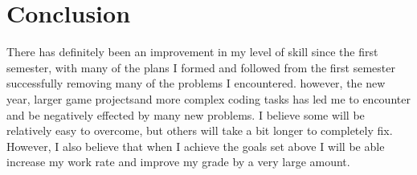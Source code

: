 \documentclass{scrartcl}
\begin{document}
\section{Conclusion}
There has definitely been an improvement in my level of skill since the first semester, with many of the plans I formed and followed from the first semester successfully removing many of the problems I encountered. however, the new year, larger game projectsand more complex coding tasks has led me to encounter and be negatively effected by many new problems. I believe some will be relatively easy to overcome, but others will take a bit longer to completely fix. However, I also believe that when I achieve the goals set above I will be able increase my work rate and improve my grade by a very large amount.
\end{document}
